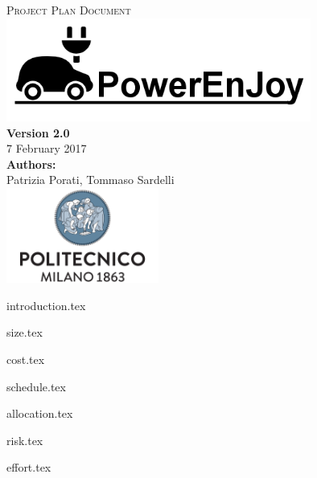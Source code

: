 \documentclass[a4paper,11pt]{article}
\begin{document}
\begin{titlepage}
\begin{center}
\textsc{\LARGE Project Plan Document}\\[1.5cm] %

\includegraphics[width=10cm]{PowerEnJoy}\\
\vfill
\vfill
\textbf{Version 2.0}\\
7 February 2017\\[0.5cm]
\textbf{Authors:}\\
Patrizia Porati, Tommaso Sardelli\\[2.0cm] 


\vfill
\vfill
\includegraphics[width=50mm]{polimi}\\
\end{center}
\end{titlepage}

\tableofcontents
\pagebreak

{introduction.tex}


{size.tex}


{cost.tex}


{schedule.tex}

{allocation.tex}

{risk.tex}

{effort.tex}
\end{document}
